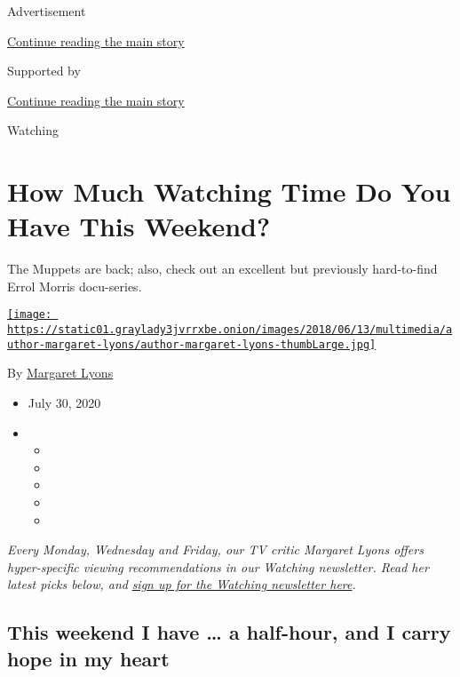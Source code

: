 Advertisement

\protect\hyperlink{after-top}{Continue reading the main story}

Supported by

\protect\hyperlink{after-sponsor}{Continue reading the main story}

Watching

\hypertarget{how-much-watching-time-do-you-have-this-weekend}{%
\section{How Much Watching Time Do You Have This
Weekend?}\label{how-much-watching-time-do-you-have-this-weekend}}

The Muppets are back; also, check out an excellent but previously
hard-to-find Errol Morris docu-series.

\href{https://www.nytimes3xbfgragh.onion/by/margaret-lyons}{\texttt{[image: https://static01.graylady3jvrrxbe.onion/images/2018/06/13/multimedia/author-margaret-lyons/author-margaret-lyons-thumbLarge.jpg]}}

By \href{https://www.nytimes3xbfgragh.onion/by/margaret-lyons}{Margaret
Lyons}

\begin{itemize}
\item
  July 30, 2020
\item
  \begin{itemize}
  \item
  \item
  \item
  \item
  \item
  \end{itemize}
\end{itemize}

\emph{Every Monday, Wednesday and Friday, our TV critic Margaret Lyons
offers hyper-specific viewing recommendations in our Watching
newsletter. Read her latest picks below, and}
\href{https://www.nytimes3xbfgragh.onion/newsletters/watching}{\emph{sign
up for the Watching newsletter here}}\emph{.}

\hypertarget{this-weekend-i-have--a-half-hour-and-i-carry-hope-in-my-heart}{%
\subsection{This weekend I have \ldots{} a half-hour, and I carry hope
in my
heart}\label{this-weekend-i-have--a-half-hour-and-i-carry-hope-in-my-heart}}

